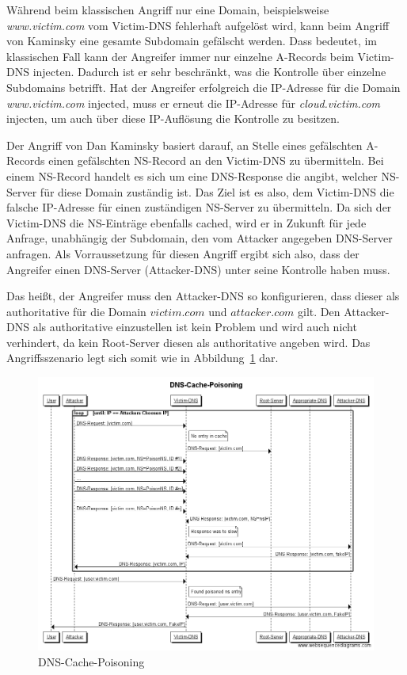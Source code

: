 \documentclass[10pt,a4paper]{article}
\begin{document}
Während beim klassischen Angriff nur eine Domain, beispielsweise \emph{www.victim.com} vom Victim-DNS fehlerhaft aufgelöst wird, kann beim Angriff von Kaminsky eine gesamte Subdomain gefälscht werden. Dass bedeutet, im klassischen Fall kann der Angreifer immer nur einzelne A-Records beim Victim-DNS \glqq injecten\grqq. Dadurch ist er sehr beschränkt, was die Kontrolle über einzelne Subdomains betrifft. Hat der Angreifer erfolgreich die IP-Adresse für die Domain \emph{www.victim.com} \glqq injected\grqq, muss er erneut die IP-Adresse für \emph{cloud.victim.com}  \glqq injecten\grqq, um auch über diese IP-Auflösung die Kontrolle zu besitzen. 

Der Angriff von Dan Kaminsky basiert darauf, an Stelle eines gefälschten A-Records einen gefälschten NS-Record an den Victim-DNS zu übermitteln. Bei einem NS-Record handelt es sich um eine DNS-Response die angibt, welcher NS-Server für diese Domain zuständig ist. Das Ziel ist es also, dem Victim-DNS die falsche IP-Adresse für einen zuständigen NS-Server zu übermitteln. Da sich der Victim-DNS die NS-Einträge ebenfalls cached, wird er in Zukunft für jede Anfrage, unabhängig der Subdomain, den vom Attacker angegeben DNS-Server anfragen. Als Vorraussetzung für diesen Angriff ergibt sich also, dass der Angreifer einen DNS-Server (Attacker-DNS) unter seine Kontrolle haben muss. 

Das heißt, der Angreifer muss den Attacker-DNS so konfigurieren, dass dieser als authoritative für die Domain $victim.com$ und $attacker.com$ gilt. Den Attacker-DNS als authoritative einzustellen ist kein Problem und wird auch nicht verhindert, da kein Root-Server diesen als authoritative angeben wird. Das Angriffsszenario legt sich somit wie in Abbildung~\ref{pic:DNSCP} dar.
\begin{figure}[h]
	\centering
	\includegraphics[scale=0.4]{DNS-Cache-Poisoning.png}
	\caption{DNS-Cache-Poisoning}
	\label{pic:DNSCP}
\end{figure} 
\end{document}
